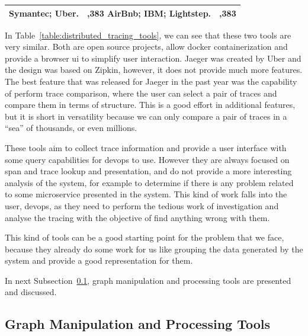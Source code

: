 \begin{table}[]
\begin{tabularx}{\linewidth} {
            >{\hsize=0.234\hsize}X|
            >{\hsize=0,383\hsize}X|
            >{\hsize=0,383\hsize}X|}
        Symantec; \newline
        Uber. \newline
         & AirBnb; \newline
        IBM; \newline
        Lightstep.                                                                                                                                                                                                      \\ \hline
    \end{tabularx}
\end{table}

In Table~\ref{table:distributed_tracing_tools}, we can see that these two tools are very similar. Both are open source projects, allow docker containerization and provide a browser ui to simplify user interaction. Jaeger was created by Uber and the design was based on Zipkin, however, it does not provide much more features. The best feature that was released for Jaeger in the past year was the capability of perform trace comparison, where the user can select a pair of traces and compare them in terms of structure. This is a good effort in additional features, but it is short in versatility because we can only compare a pair of traces in a ``sea'' of thousands, or even millions.

These tools aim to collect trace information and provide a user interface with some query capabilities for \gls{devops} to use. However they are always focused on span and trace lookup and presentation, and do not provide a more interesting analysis of the system, for example to determine if there is any problem related to some microservice presented in the system. This kind of work falls into the user, \gls{devops}, as they need to perform the tedious work of investigation and analyse the tracing with the objective of find anything wrong with them.

This kind of tools can be a good starting point for the problem that we face, because they already do some work for us like grouping the data generated by the system and provide a good representation for them.

In next Subsection~\ref{subsec:graph_manipulation_and_processing_tools}, graph manipulation and processing tools are presented and discussed.

\subsection{Graph Manipulation and Processing Tools}
\label{subsec:graph_manipulation_and_processing_tools}

